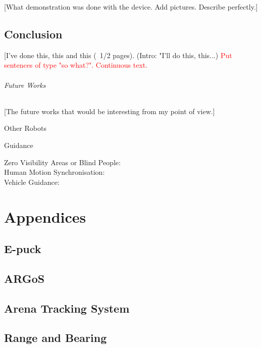 \documentclass[oneside, a4paper, 12pt]{memoir}
\begin{document}
	[What demonstration was done with the device. Add pictures. Describe perfectly.]

\chapter{Conclusion}

[I've done this, this and this (~1/2 pages). (Intro: "I'll do this, this...) \textcolor{red}{Put sentences of type "so what?". Continuous text.}

	\paragraph{Future Works}
	[The future works that would be interesting from my point of view.]
	
		\subparagraph{Other Robots}
		\subparagraph{Guidance}
			
			\begin{description}
				\item[Zero Visibility Areas or Blind People:]
				\item[Human Motion Synchronisation:]
				\item[Vehicle Guidance:]
			\end{description}
			

\part*{Appendices}
\appendix


\chapter{E-puck}

\chapter{ARGoS}

\chapter{Arena Tracking System}
\label{app:arena_tracking_system}

\chapter{Range and Bearing}
\end{document}
